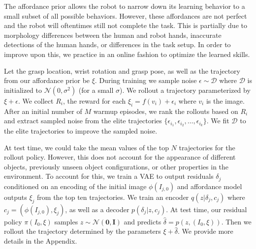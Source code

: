 The affordance prior allows the robot to narrow down its learning behavior to a small subset of all possible behaviors. However, these affordances are not perfect and the robot will oftentimes still not complete the task.  This is partially due to morphology differences between the human and robot hands, inaccurate detections of the human hands, or differences in the task setup. In order to improve upon this, we practice in an online fashion to optimize the learned skills. 

Let the grasp location, wrist rotation and grasp pose, as well as the trajectory from our affordance prior be $\xi$. During training we sample noise $\epsilon \sim \mathcal{D}$ where $\mathcal{D}$ is initialized to $\mathcal{N}(0, \sigma^2)$ (for a small $\sigma$). We rollout a trajectory parameterized by $\xi + \epsilon$. We collect $R_i$, the reward for each $\xi_i = f(v_i) + \epsilon_i$ where $v_i$ is the image.  After an initial number of $M$ warmup episodes, we rank the rollouts based on $R_i$ and extract sampled noise from the elite trajectories $\{ \epsilon_{i_1}, \epsilon_{i_2}, \dots, \epsilon_{i_k} \}$. We fit $\mathcal{D}$ to the elite trajectories to improve the sampled noise. 

At test time, we could take the mean values of the top $N$ trajectories for the rollout policy.  However, this does not account for the appearance of different objects, previously unseen object configurations, or other properties in the environment. To account for this, we train a VAE \cite{SohnNIPS2015, rezende2014stochastic, rezende2014vae, kingma2013vae} to output residuals $\delta_j$ conditioned on an encoding of the initial image $\phi(I_{j, 0})$ and affordance model outputs $\xi_j$ from the top ten trajectories. We train an encoder $q(z | \delta_j, c_j)$ where $c_j = (\phi(I_{j, 0}), \xi_j)$, as well as a decoder $p(\delta_j | z, c_j)$. At test time, our residual policy $\pi (I_0, \xi)$ samples $z \sim \mathcal{N}(\mathbf{0}, \mathbf{I})$ and predicts $\hat{\delta} = p(z, (I_0, \xi))$. Then we rollout the trajectory determined by the parameters $\xi + \hat{\delta}$. We provide more details in the Appendix. 
